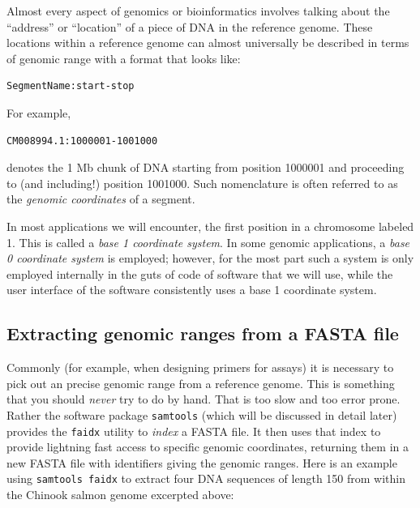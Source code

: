 \documentclass[]{krantz}
\begin{document}
Almost every aspect of genomics or bioinformatics involves talking about the
``address'' or ``location'' of a piece of DNA in the reference genome. These locations
within a reference genome can almost universally be described in terms of genomic range
with a format that looks like:

\begin{verbatim}
SegmentName:start-stop
\end{verbatim}

For example,

\begin{verbatim}
CM008994.1:1000001-1001000
\end{verbatim}

denotes the 1 Mb chunk of DNA starting from position 1000001 and proceeding
to (and including!) position 1001000.
Such nomenclature is often referred to as the \emph{genomic coordinates} of a
segment.

In most applications we will encounter, the first position in a chromosome
labeled 1. This is called a \emph{base 1 coordinate system}. In some genomic
applications, a \emph{base 0 coordinate system} is employed; however, for the most
part such a system is only employed internally in the guts of code of software that we
will use, while the user interface of the software consistently uses a
base 1 coordinate system.

\hypertarget{extracting-genomic-ranges-from-a-fasta-file}{%
\subsection{Extracting genomic ranges from a FASTA file}\label{extracting-genomic-ranges-from-a-fasta-file}}

Commonly (for example, when designing primers for assays) it is necessary
to pick out an precise genomic range from a reference genome. This
is something that you should \emph{never} try to do by hand. That is too
slow and too error prone. Rather the software package \texttt{samtools} (which
will be discussed in detail later) provides the \texttt{faidx} utility to \emph{index} a FASTA
file. It then uses that index to provide lightning fast access to
specific genomic coordinates, returning them in a new FASTA file with
identifiers giving the genomic ranges. Here is an example using \texttt{samtools\ faidx} to
extract four DNA sequences of length 150 from within the Chinook salmon genome
excerpted above:
\end{document}
